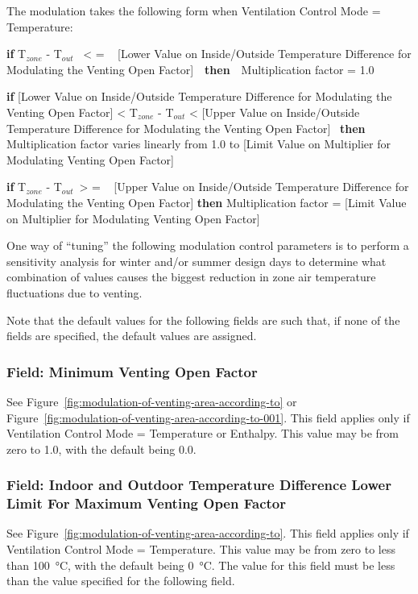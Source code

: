 The modulation takes the following form when Ventilation Control Mode = Temperature:

\textbf{if} T\(_{zone}\) - T\(_{out}\) ~\textless{} = ~ {[}Lower Value on Inside/Outside Temperature Difference for Modulating the Venting Open Factor{]}~~\textbf{then}~~Multiplication factor = 1.0

\textbf{if} {[}Lower Value on Inside/Outside Temperature Difference for Modulating the Venting Open Factor{]} \textless{} T\(_{zone}\) - T\(_{out}\) \textless{} {[}Upper Value on Inside/Outside Temperature Difference for Modulating the Venting Open Factor{]}~ \textbf{then} Multiplication factor varies linearly from 1.0 to {[}Limit Value on Multiplier for Modulating Venting Open Factor{]}

\textbf{if} T\(_{zone}\) - T\(_{out}\)~\textgreater{} = ~ {[}Upper Value on Inside/Outside Temperature Difference for Modulating the Venting Open Factor{]} \textbf{then} Multiplication factor = {[}Limit Value on Multiplier for Modulating Venting Open Factor{]}

One way of ``tuning'' the following modulation control parameters is to perform a sensitivity analysis for winter and/or summer design days to determine what combination of values causes the biggest reduction in zone air temperature fluctuations due to venting.

Note that the default values for the following fields are such that, if none of the fields are specified, the default values are assigned.

\subsubsection{Field: Minimum Venting Open Factor}\label{field-minimum-venting-open-factor}

See Figure~\ref{fig:modulation-of-venting-area-according-to} or Figure~\ref{fig:modulation-of-venting-area-according-to-001}. This field applies only if Ventilation Control Mode = Temperature or Enthalpy. This value may be from zero to 1.0, with the default being 0.0.

\subsubsection{Field: Indoor and Outdoor Temperature Difference Lower Limit For Maximum Venting Open Factor}\label{field-indoor-and-outdoor-temperature-difference-lower-limit-for-maximum-venting-open-factor}

See Figure~\ref{fig:modulation-of-venting-area-according-to}. This field applies only if Ventilation Control Mode = Temperature. This value may be from zero to less than \SI{100}{\celsius}, with the default being \SI{0}{\celsius}. The value for this field must be less than the value specified for the following field.

